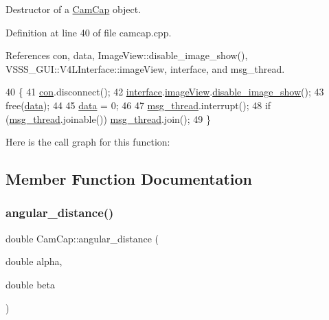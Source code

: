 Destructor of a \hyperlink{class_cam_cap}{Cam\+Cap} object. 



Definition at line 40 of file camcap.\+cpp.



References con, data, Image\+View\+::disable\+\_\+image\+\_\+show(), V\+S\+S\+S\+\_\+\+G\+U\+I\+::\+V4\+L\+Interface\+::image\+View, interface, and msg\+\_\+thread.


\begin{DoxyCode}
40                \{
41     \hyperlink{class_cam_cap_a608a3c47ba3c1c046794e3f074b97cea}{con}.disconnect();
42     \hyperlink{class_cam_cap_a58002893dfb61307042ddbba0c362dcd}{interface}.\hyperlink{class_v_s_s_s___g_u_i_1_1_v4_l_interface_a2c99f4d9fad8a34fa98d5b61beb06745}{imageView}.\hyperlink{class_image_view_a52c3ac86c941bcdfdd4fd8c711e53184}{disable\_image\_show}();
43     free(\hyperlink{class_cam_cap_a516da4047c872d26767e50fb09799400}{data});
44 
45     \hyperlink{class_cam_cap_a516da4047c872d26767e50fb09799400}{data} = 0;
46     
47     \hyperlink{class_cam_cap_a0aedb5217ab6aa3d7c383a6f39c940cd}{msg\_thread}.interrupt();
48     \textcolor{keywordflow}{if} (\hyperlink{class_cam_cap_a0aedb5217ab6aa3d7c383a6f39c940cd}{msg\_thread}.joinable()) \hyperlink{class_cam_cap_a0aedb5217ab6aa3d7c383a6f39c940cd}{msg\_thread}.join();
49 \}
\end{DoxyCode}
Here is the call graph for this function\+:


\subsection{Member Function Documentation}
\mbox{\label{class_cam_cap_abf57bed0fb3a45bb50947cd6f42698ea}} 
\subsubsection{\texorpdfstring{angular\+\_\+distance()}{angular\_distance()}}
{\footnotesize\ttfamily double Cam\+Cap\+::angular\+\_\+distance (\begin{DoxyParamCaption}\item[{double}]{alpha,  }\item[{double}]{beta }\end{DoxyParamCaption})}



